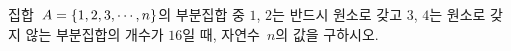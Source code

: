 집합~$A=\{1{,}\mkern3mu\mathopen{}2{,}\mkern3mu\mathopen{}3{,}\mkern3mu\mathopen{}\cdots{,}\mkern3mu\mathopen{}n\}$의 부분집합 중 $1$, $2$는 반드시 원소로 갖고 $3$, $4$는 원소로 갖지 않는 부분집합의 개수가 $16$일 때, 자연수~$n$의 값을 구하시오.
